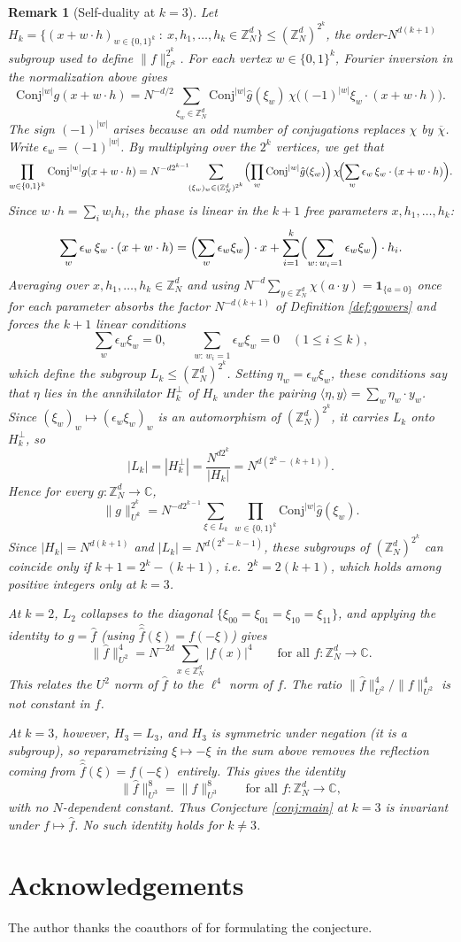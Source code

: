\documentclass[12pt]{amsart}
\newcommand{\Z}{\mathbb{Z}}
\newcommand{\C}{\mathbb{C}}
\newcommand{\Conj}{\mathrm{Conj}}
\newtheorem{remark}[theorem]{Remark}
\begin{document}
\begin{remark}[Self-duality at $k=3$]\label{rem:selfdual}
Let $H_k=\{(x+w\cdot h)_{w\in\{0,1\}^k}\ :\ x,h_1,\dots,h_k\in\Z_N^d\}\le(\Z_N^d)^{2^k}$,
the order-$N^{d(k+1)}$ subgroup used to define $\|f\|_{U^k}^{2^k}$. For each vertex $w\in\{0,1\}^k$, Fourier inversion in the normalization above gives
\[
\Conj^{|w|} g(x+w\cdot h)
= N^{-d/2}\sum_{\xi_w\in\Z_N^d}\Conj^{|w|}\hat g(\xi_w)\,
\chi\!\bigl((-1)^{|w|}\xi_w\cdot(x+w\cdot h)\bigr).
\]
The sign $(-1)^{|w|}$ arises because an odd number of conjugations replaces $\chi$ by
$\overline\chi$. Write $\epsilon_w=(-1)^{|w|}$. By multiplying over the $2^k$ vertices, we get that
\[
\prod_{w\in\{0,1\}^k}\Conj^{|w|}g(x+w\cdot h)
= N^{-d2^{k-1}}\!\!\sum_{(\xi_w)_w\in(\Z_N^d)^{2^k}}
\Bigl(\prod_w\Conj^{|w|}\hat g(\xi_w)\Bigr)\,
\chi\!\Bigl(\sum_w\epsilon_w\,\xi_w\cdot(x+w\cdot h)\Bigr).
\]
Since $w\cdot h=\sum_i w_ih_i$, the phase is linear in the $k+1$ free parameters
$x,h_1,\dots,h_k$:
\[
\sum_w\epsilon_w\,\xi_w\cdot(x+w\cdot h)
=\Bigl(\sum_w\epsilon_w\xi_w\Bigr)\cdot x
+\sum_{i=1}^k\Bigl(\sum_{w:\,w_i=1}\epsilon_w\xi_w\Bigr)\cdot h_i .
\]
Averaging over $x,h_1,\dots,h_k\in\Z_N^d$ and using
$N^{-d}\sum_{y\in\Z_N^d}\chi(a\cdot y)=\mathbf 1_{\{a=0\}}$ once for each parameter absorbs the
factor $N^{-d(k+1)}$ of Definition \ref{def:gowers} and forces the $k+1$ linear conditions
\[
\sum_{w}\epsilon_w\xi_w=0,
\qquad
\sum_{w:\,w_i=1}\epsilon_w\xi_w=0\quad(1\le i\le k),
\]
which define the subgroup $L_k\le(\Z_N^d)^{2^k}$. Setting $\eta_w=\epsilon_w\xi_w$, these
conditions say that $\eta$ lies in the annihilator $H_k^{\perp}$ of $H_k$ under the
pairing $\langle\eta,y\rangle=\sum_w\eta_w\cdot y_w$. Since $(\xi_w)_w\mapsto(\epsilon_w\xi_w)_w$
is an automorphism of $(\Z_N^d)^{2^k}$, it carries $L_k$ onto $H_k^{\perp}$, so
\[
|L_k|=|H_k^{\perp}|=\frac{N^{d2^k}}{|H_k|}=N^{d(2^k-(k+1))}.
\]
Hence for every $g:\Z_N^d\to\C$,
\[
\|g\|_{U^k}^{2^k}=N^{-d2^{k-1}}\sum_{\xi\in L_k}\ \prod_{w\in\{0,1\}^k}\Conj^{|w|}\hat g(\xi_w).
\]
Since $|H_k|=N^{d(k+1)}$ and $|L_k|=N^{d(2^k-k-1)}$, these subgroups of $(\Z_N^d)^{2^k}$ can
coincide only if $k+1=2^k-(k+1)$, i.e.\ $2^k=2(k+1)$, which holds among positive integers
only at $k=3$.

At $k=2$, $L_2$ collapses to the diagonal $\{\xi_{00}=\xi_{01}=\xi_{10}=\xi_{11}\}$, and
applying the identity to $g=\hat f$ (using $\widehat{\hat f}(\xi)=f(-\xi)$) gives
\[
\|\hat f\|_{U^2}^4=N^{-2d}\sum_{x\in\Z_N^d}|f(x)|^4
\qquad\text{for all } f:\Z_N^d\to\C.
\]
This relates the $U^2$ norm of $\hat f$ to the $\ell^4$ norm of $f$. The ratio $\|\hat f\|_{U^2}^4/\|f\|_{U^2}^4$ is not
constant in $f$.

At $k=3$, however, $H_3=L_3$, and $H_3$ is symmetric under negation (it is a
subgroup), so reparametrizing $\xi\mapsto-\xi$ in the sum above removes the reflection coming
from $\widehat{\hat f}(\xi)=f(-\xi)$ entirely. This gives the identity
\[
\|\hat f\|_{U^3}^8=\|f\|_{U^3}^8
\qquad\text{for all } f:\Z_N^d\to\C,
\]
with \emph{no} $N$-dependent constant. Thus Conjecture \ref{conj:main} at $k=3$ is invariant under $f\mapsto\hat f$. No such identity holds for $k\ne3$.
\end{remark}

\section*{Acknowledgements}
The author thanks the coauthors of \cite{RefinedUncertainty} for formulating the conjecture.



\end{document}
